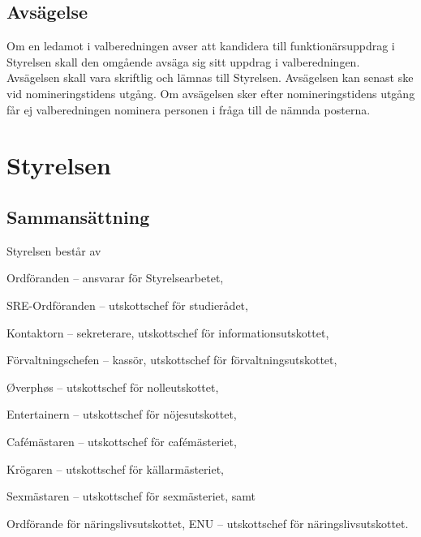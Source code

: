 \documentclass[10pt]{article}
\begin{document}
\subsection{Avsägelse}
Om en ledamot i valberedningen avser att kandidera till funktionärsuppdrag
i Styrelsen skall den omgående avsäga sig sitt
uppdrag i valberedningen. Avsägelsen skall vara skriftlig och lämnas till
Styrelsen. Avsägelsen kan senast ske vid nomineringstidens
utgång. Om avsägelsen sker efter nomineringstidens utgång får ej
valberedningen nominera personen i fråga till de nämnda posterna.

\section{Styrelsen} %
\subsection{Sammansättning}
Styrelsen består av
\begin{alphlist}
    \item Ordföranden -- ansvarar för Styrelsearbetet,
    \item SRE-Ordföranden -- utskottschef för studierådet,
    \item Kontaktorn -- sekreterare, utskottschef för informationsutskottet,
    \item Förvaltningschefen -- kassör, utskottschef för förvaltningsutskottet,
    \item Øverphøs -- utskottschef för nolleutskottet,
    \item Entertainern -- utskottschef för nöjesutskottet,
    \item Cafémästaren -- utskottschef för cafémästeriet,
    \item Krögaren -- utskottschef för källarmästeriet,
    \item Sexmästaren -- utskottschef för sexmästeriet, samt
    \item Ordförande för näringslivsutskottet, ENU
        -- utskottschef för näringslivsutskottet.
\end{alphlist}
\end{document}
